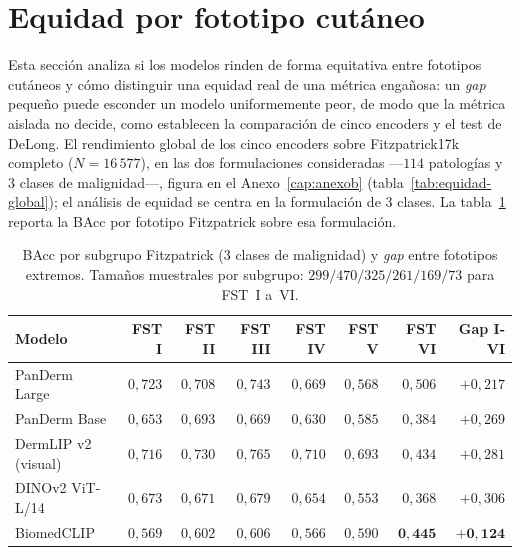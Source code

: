 \section{Equidad por fototipo cutáneo}
\label{sec:equidad-results}

Esta sección analiza si los modelos rinden de forma equitativa entre
fototipos cutáneos y cómo distinguir una equidad real de una métrica
engañosa: un \emph{gap} pequeño puede esconder un modelo
uniformemente peor, de modo que la métrica aislada no decide, como
establecen la comparación de cinco encoders y el test de DeLong. El rendimiento global de los cinco encoders sobre Fitzpatrick17k
completo ($N = 16\,577$), en las dos formulaciones consideradas
---$114$ patologías y $3$ clases de malignidad---, figura en el
Anexo~\ref{cap:anexob} (tabla~\ref{tab:equidad-global}); el análisis
de equidad se centra en la formulación de $3$ clases. La
tabla~\ref{tab:equidad-fototipo} reporta la BAcc por fototipo
Fitzpatrick sobre esa formulación.

\begin{table}[H]
\centering
\footnotesize
\setlength{\tabcolsep}{4pt}
\renewcommand{\arraystretch}{0.95}
\caption{BAcc por subgrupo Fitzpatrick (3 clases de malignidad) y
\emph{gap} entre fototipos extremos. Tamaños muestrales por
subgrupo: $299 / 470 / 325 / 261 / 169 / 73$ para FST~I a~VI.}
\label{tab:equidad-fototipo}
\begin{tabular}{lrrrrrrr}
\hline
Modelo                    & FST I         & FST II        & FST III       & FST IV        & FST V         & FST VI        & Gap I-VI \\
\hline
PanDerm Large             & $0{,}723$     & $0{,}708$     & $0{,}743$     & $0{,}669$     & $0{,}568$     & $0{,}506$     & $+0{,}217$ \\
PanDerm Base              & $0{,}653$     & $0{,}693$     & $0{,}669$     & $0{,}630$     & $0{,}585$     & $0{,}384$     & $+0{,}269$ \\
DermLIP v2 (visual)       & $0{,}716$     & $0{,}730$     & $0{,}765$     & $0{,}710$     & $0{,}693$     & $0{,}434$     & $+0{,}281$ \\
DINOv2 ViT-L/14           & $0{,}673$     & $0{,}671$     & $0{,}679$     & $0{,}654$     & $0{,}553$     & $0{,}368$     & $+0{,}306$ \\
BiomedCLIP                & $0{,}569$     & $0{,}602$     & $0{,}606$     & $0{,}566$     & $0{,}590$     & $\mathbf{0{,}445}$ & $\mathbf{+0{,}124}$ \\
\hline
\end{tabular}
\end{table}

